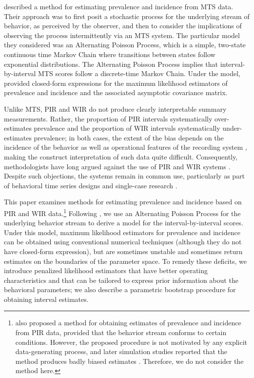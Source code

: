 \documentclass[man, noextraspace, floatsintext]{apa6}\usepackage[]{graphicx}\usepackage[]{color}
\begin{document}
\citet{Brown1977estimation} described a method for estimating prevalence and incidence from MTS data. Their approach was to first posit a stochastic process for the underlying stream of behavior, as perceived by the observer, and then to consider the implications of observing the process intermittently via an MTS system. The particular model they considered was an Alternating Poisson Process, which is a simple, two-state continuous time Markov Chain where transitions between states follow exponential distributions. The Alternating Poisson Process implies that interval-by-interval MTS scores follow a discrete-time Markov Chain. Under the model, \citet[see also \citealp{Griffin1983parametric}]{Brown1977estimation} provided closed-form expressions for the maximum likelihood estimators of prevalence and incidence and the associated asymptotic covariance matrix.

Unlike MTS, PIR and WIR do not produce clearly interpretable summary measurements. Rather, the proportion of PIR intervals systematically over-estimates prevalence and the proportion of WIR intervals systematically under-estimates prevalence; in both cases, the extent of the bias depends on the incidence of the behavior as well as operational features of the recording system \citep{Kraemer1979one, Rogosa1991statistical}, making the construct interpretation of such data quite difficult. Consequently, methodologists have long argued against the use of PIR and WIR systems \citep[cf.]{Altmann1974observational, Mann1991time, Lane2014using}. Despite such objections, the systems remain in common use, particularly as part of behavioral time series designs and single-case research \citep{Rapp2007interval, Mudford2009continuous, Lane2014using}. 

This paper examines methods for estimating prevalence and incidence based on PIR and WIR data.\footnote{\citet{Suen1986post, Suen1989analyzing} also proposed a method for obtaining estimates of prevalence and incidence from PIR data, provided that the behavior stream conforms to certain conditions. However, the proposed procedure is not motivated by any explicit data-generating process, and later simulation studies reported that the method produces badly biased estimates \citep[sec. 5.2]{Rogosa1991statistical}. Therefore, we do not consider the method here.} Following \citet{Brown1977estimation}, we use an Alternating Poisson Process for the underlying behavior stream to derive a model for the interval-by-interval scores. Under this model, maximum likelihood estimators for prevalence and incidence can be obtained using conventional numerical techniques (although they do not have closed-form expression), but are sometimes unstable and sometimes return estimates on the boundaries of the parameter space. To remedy these deficits, we introduce penalized likelihood estimators that have better operating characteristics and that can be tailored to express prior information about the behavioral parameters; we also describe a parametric bootstrap procedure for obtaining interval estimates.
\end{document}

